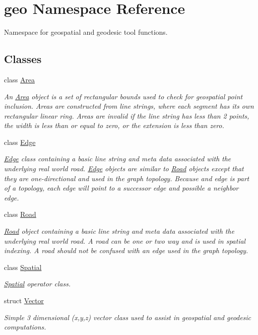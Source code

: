 \hypertarget{namespacegeo}{}\section{geo Namespace Reference}
\label{namespacegeo}


Namespace for geospatial and geodesic tool functions.  


\subsection*{Classes}
\begin{DoxyCompactItemize}
\item 
class \hyperlink{classgeo_1_1Area}{Area}
\begin{DoxyCompactList}\small\item\em An \hyperlink{classgeo_1_1Area}{Area} object is a set of rectangular bounds used to check for geospatial point inclusion. Areas are constructed from line strings, where each segment has it\textquotesingle{}s own rectangular linear ring. Areas are invalid if the line string has less than 2 points, the width is less than or equal to zero, or the extension is less than zero. \end{DoxyCompactList}\item 
class \hyperlink{classgeo_1_1Edge}{Edge}
\begin{DoxyCompactList}\small\item\em \hyperlink{classgeo_1_1Edge}{Edge} class containing a basic line string and meta data associated with the underlying real world road. \hyperlink{classgeo_1_1Edge}{Edge} objects are similar to \hyperlink{classgeo_1_1Road}{Road} objects except that they are one-\/directional and used in the graph topology. Because and edge is part of a topology, each edge will point to a successor edge and possible a neighbor edge. \end{DoxyCompactList}\item 
class \hyperlink{classgeo_1_1Road}{Road}
\begin{DoxyCompactList}\small\item\em \hyperlink{classgeo_1_1Road}{Road} object containing a basic line string and meta data associated with the underlying real world road. A road can be one or two way and is used in spatial indexing. A road should not be confused with an edge used in the graph topology. \end{DoxyCompactList}\item 
class \hyperlink{classgeo_1_1Spatial}{Spatial}
\begin{DoxyCompactList}\small\item\em \hyperlink{classgeo_1_1Spatial}{Spatial} operator class. \end{DoxyCompactList}\item 
struct \hyperlink{structgeo_1_1Vector}{Vector}
\begin{DoxyCompactList}\small\item\em Simple 3 dimensional (x,y,z) vector class used to assist in geospatial and geodesic computations. \end{DoxyCompactList}\end{DoxyCompactItemize}
